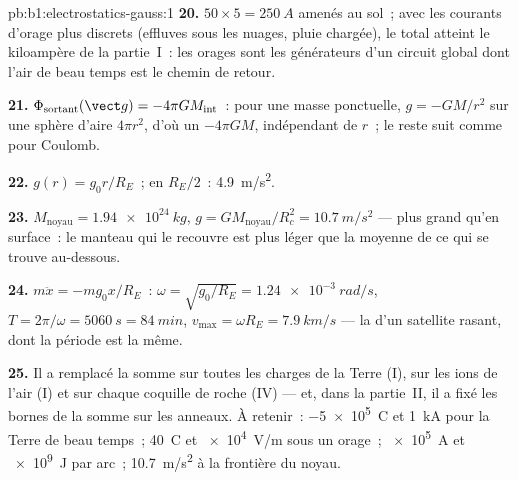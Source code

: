 \begin{solution}{pb:b1:electrostatics-gauss:1}
\textbf{20.} $50 \times 5 = \qty{250}{A}$ amenés au sol~; avec les courants
d'orage plus discrets (effluves sous les nuages, pluie chargée), le total
atteint le kiloampère de la partie~I~: les orages sont les générateurs d'un
circuit global dont l'air de beau temps est le chemin de retour.

\textbf{21.} $\Phi_{\text{sortant}}(\vect g) = -4\pi GM_{\text{int}}$~: pour une masse ponctuelle,
$g = -GM/r^2$ sur une sphère d'aire $4\pi r^2$, d'où un  $-4\pi GM$, indépendant
de $r$~; le reste suit comme pour Coulomb.

\textbf{22.} $g(r) = g_0r/R_E$~; en $R_E/2$~: \qty{4.9}{m/s^2}.

\textbf{23.} $M_{\text{noyau}} = \qty{1.94e24}{kg}$, $g = GM_{\text{noyau}}/R_c^2 =
\qty{10.7}{m/s^2}$ --- plus grand qu'en surface~: le manteau qui le recouvre est
plus léger que la moyenne de ce qui se trouve au-dessous.

\textbf{24.} $m\ddot x = -mg_0x/R_E$~: $\omega = \sqrt{g_0/R_E} = \qty{1.24e-3}{rad/s}$,
$T = 2\pi/\omega = \qty{5060}{s} = \qty{84}{min}$, $v_{\max} = \omega R_E =
\qty{7.9}{km/s}$ --- la  d'un satellite rasant, dont la période
est la même.

\textbf{25.} Il a remplacé la somme sur toutes les charges de la Terre (I),
sur les ions de l'air (I) et sur chaque coquille de roche (IV) --- et, dans
la partie~II, il a fixé les bornes de la somme sur les anneaux. À retenir~:
\qty{-5e5}{C} et \qty{1}{kA} pour la Terre de beau temps~; \qty{40}{C} et
\qty{e4}{V/m} sous un orage~; \qty{e5}{A} et \qty{e9}{J} par arc~;
\qty{10.7}{m/s^2} à la frontière du noyau.
\end{solution}
